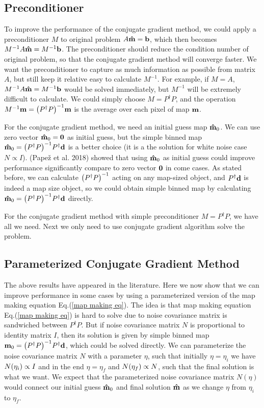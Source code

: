 \documentclass[11pt, letterpaper]{article}
\newcommand{\vbd}{\vb{d}}
\newcommand{\vbm}{\vb{m}}
\newcommand{\vbb}{\vb{b}}
\newcommand{\inv}[1]{#1^{-1}}
\newcommand{\hatm}{\vb{\hat{m}}}
\newcommand{\Pdagger}{P^{\dagger}}
\newcommand{\PPinv}[1]{\inv{\qty(\Pdagger #1 P)}}
\begin{document}
\subsection{Preconditioner}
To improve the performance of the conjugate gradient method,
we could apply a preconditioner $M$ to original problem $A\hatm = \vbb$,
which then becomes $\inv{M}A\hatm = \inv{M} \vbb$.
The preconditioner should reduce the condition number of original problem,
so that the conjugate gradient method will converge faster.
We want the preconditioner to capture as much information as possible from 
matrix $A$, but still keep it relative easy to calculate $\inv{M}$.
For example, if $M = A$, $\inv{M} A \hatm = \inv{M} \vbb$ would be solved
immediately, but $\inv{M}$ will be extremely difficult to calculate.
We could simply choose $M = \Pdagger P$,
and the operation $\inv{M} \vbm = \PPinv{} \vbm$ is the average over each pixel 
of map $\vbm$.

For the conjugate gradient method, we need an initial guess map $\hatm_0$. 
We can use zero vector $\hatm_0 = \vb{0}$ as initial guess,
but the simple binned map $\hatm_0 = \PPinv{} \Pdagger \vbd$ is a better 
choice (it is a the solution for white noise case $N \propto I$).
(Pape\v{z} et al. 2018\cite{2018A&A...620A..59P}) showed that using 
$\hatm_0$ as initial guess could improve performance significantly compare to
zero vector $\vb{0}$ in come cases.
As stated before, we can calculate $\PPinv{}$ acting on any map-sized object,
and $\Pdagger \vbd$ is indeed a map size object, 
so we could obtain simple binned map by calculating
$\hatm_0 = \PPinv{} \Pdagger \vbd$ directly.

For the conjugate gradient method with simple preconditioner $M = \Pdagger P$,
we have all we need.  Next we only need to use conjugate gradient algorithm solve the problem.

\subsection{Parameterized Conjugate Gradient Method}

The above results have appeared in the literature.  Here we now show that we 
can improve performance in some cases by using a parameterized version of the map making equation Eq.(\ref{map making eq}).
The idea is that map making equation Eq.(\ref{map making eq}) is hard to solve
due to noise covariance matrix is sandwiched between $\Pdagger P$.
But if noise covariance matrix $N$ is proportional to identity matrix $I$, 
then its solution is given by simple binned map
$\vbm_0 = \inv{\qty(\Pdagger P)} \Pdagger \vbd$,
which could be solved directly. 
We can parameterize the noise covariance matrix $N$ with a parameter $\eta$,
such that initially $\eta = \eta_i$ we have $N\qty(\eta_i) \propto I$ 
and in the end $\eta = \eta_f$ and $N\qty(\eta_f) \propto N$,
such that the final solution is what we want.
We expect that the parameterized noise covariance matrix $N(\eta)$
would connect our initial guess $\hatm_0$ and final solution $\hatm$ as we 
change $\eta$ from $\eta_i$ to $\eta_f$.
\end{document}
